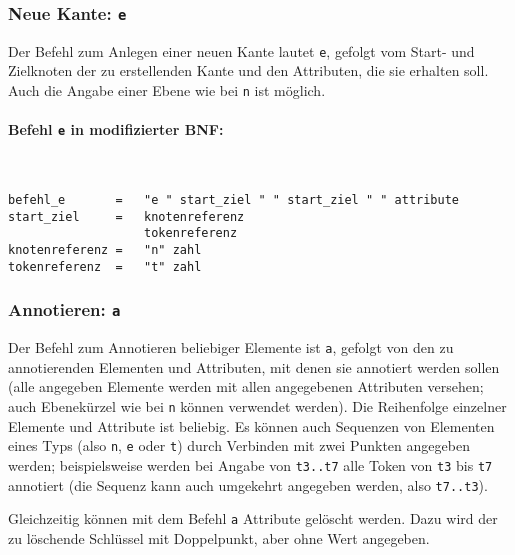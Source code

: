 \documentclass[12pt]{scrartcl}
\begin{document}
\subsubsection{Neue Kante: \texttt{e}}

Der Befehl zum Anlegen einer neuen Kante lautet \texttt{e}, gefolgt vom Start- und Zielknoten der zu erstellenden  Kante und den Attributen, die sie erhalten soll. Auch die Angabe einer Ebene wie bei \texttt{n} ist möglich.

\paragraph*{Befehl \texttt{e} in modifizierter BNF:}
~
\begin{framed}
\begin{lstlisting}
befehl_e       =   "e " start_ziel " " start_ziel " " attribute
start_ziel     =   knotenreferenz
                   tokenreferenz
knotenreferenz =   "n" zahl
tokenreferenz  =   "t" zahl
\end{lstlisting}
\end{framed}


\subsubsection{Annotieren: \texttt{a}}\label{befehl-a}

Der Befehl zum Annotieren beliebiger Elemente ist \texttt{a}, gefolgt von den zu annotierenden Elementen und Attributen, mit denen sie annotiert werden sollen (alle angegeben Elemente werden mit allen angegebenen Attributen versehen; auch Ebenekürzel wie bei \texttt{n} können verwendet werden). Die Reihenfolge einzelner Elemente und Attribute ist beliebig. Es können auch Sequenzen von Elementen eines Typs (also \texttt{n}, \texttt{e} oder \texttt{t}) durch Verbinden mit zwei Punkten angegeben werden; beispielsweise werden bei Angabe von \texttt{t3..t7} alle Token von \texttt{t3} bis \texttt{t7} annotiert (die Sequenz kann auch umgekehrt angegeben werden, also \texttt{t7..t3}).

Gleichzeitig können mit dem Befehl \texttt{a} Attribute gelöscht werden. Dazu wird der zu löschende Schlüssel mit Doppelpunkt, aber ohne Wert angegeben.
\end{document}
